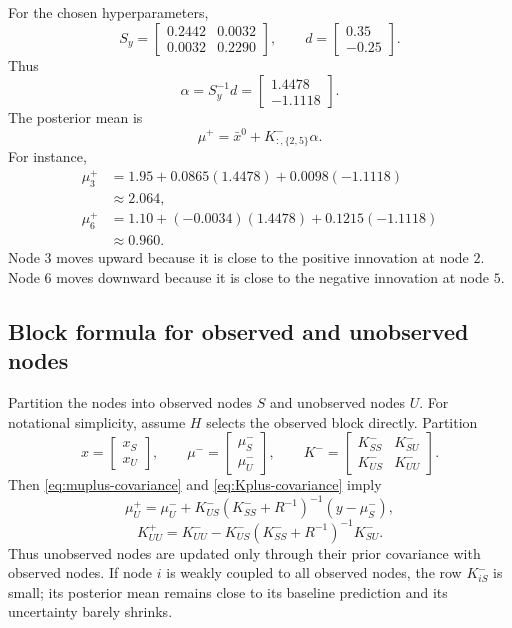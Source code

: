 \documentclass[11pt]{article}
\numberwithin{equation}{section}
\begin{document}
\begin{runningexample}
For the chosen hyperparameters,
\[
  S_y=
  \begin{bmatrix}
    0.2442&0.0032\\
    0.0032&0.2290
  \end{bmatrix},
  \qquad
  d=\begin{bmatrix}0.35\\-0.25\end{bmatrix}.
\]
Thus
\[
  \alpha=S_y^{-1}d
  =\begin{bmatrix}1.4478\\-1.1118\end{bmatrix}.
\]
The posterior mean is
\[
  \mu^+=\bar x^0+K^-_{:,\{2,5\}}\alpha.
\]
For instance,
\begin{align*}
  \mu_3^+
  &=1.95+0.0865(1.4478)+0.0098(-1.1118)\\
  &\approx 2.064,\\[1mm]
  \mu_6^+
  &=1.10+(-0.0034)(1.4478)+0.1215(-1.1118)\\
  &\approx 0.960.
\end{align*}
Node $3$ moves upward because it is close to the positive innovation at node $2$.  Node $6$ moves downward because it is close to the negative innovation at node $5$.
\end{runningexample}

\subsection{Block formula for observed and unobserved nodes}
\label{subsec:block-formula}

Partition the nodes into observed nodes $S$ and unobserved nodes $U$.  For notational simplicity, assume $H$ selects the observed block directly.  Partition
\[
  x=\begin{bmatrix}x_S\\x_U\end{bmatrix},
  \qquad
  \mu^-=\begin{bmatrix}\mu_S^-\\\mu_U^-\end{bmatrix},
  \qquad
  K^-=
  \begin{bmatrix}
    K^-_{SS}&K^-_{SU}\\
    K^-_{US}&K^-_{UU}
  \end{bmatrix}.
\]
Then \eqref{eq:muplus-covariance} and \eqref{eq:Kplus-covariance} imply
\begin{equation}
  \boxed{
  \mu_U^+=\mu_U^-+K^-_{US}(K^-_{SS}+R^{-1})^{-1}(y-\mu_S^-),}
  \label{eq:block-mean-final}
\end{equation}
\begin{equation}
  \boxed{
  K^+_{UU}=K^-_{UU}-K^-_{US}(K^-_{SS}+R^{-1})^{-1}K^-_{SU}.}
  \label{eq:block-cov-final}
\end{equation}
Thus unobserved nodes are updated only through their prior covariance with observed nodes.  If node $i$ is weakly coupled to all observed nodes, the row $K^-_{iS}$ is small; its posterior mean remains close to its baseline prediction and its uncertainty barely shrinks.
\end{document}
